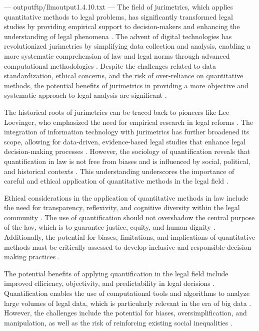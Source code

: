 ---
outputftp/llmoutput1.4.10.txt
---
The field of jurimetrics, which applies quantitative methods to legal problems, has significantly transformed legal studies by providing empirical support to decision-makers and enhancing the understanding of legal phenomena \cite{10.1007/s11186-021-09453-1,10.3390/fi9040068}. The advent of digital technologies has revolutionized jurimetrics by simplifying data collection and analysis, enabling a more systematic comprehension of law and legal norms through advanced computational methodologies \cite{10.1007/s11186-021-09453-1,unger2021process}. Despite the challenges related to data standardization, ethical concerns, and the risk of over-reliance on quantitative methods, the potential benefits of jurimetrics in providing a more objective and systematic approach to legal analysis are significant \cite{jurimetricschallenges}.

The historical roots of jurimetrics can be traced back to pioneers like Lee Loevinger, who emphasized the need for empirical research in legal reforms \cite{1023071190721}. The integration of information technology with jurimetrics has further broadened its scope, allowing for data-driven, evidence-based legal studies that enhance legal decision-making processes \cite{10.1007/s11186-021-09453-1,unger2021process}. However, the sociology of quantification reveals that quantification in law is not free from biases and is influenced by social, political, and historical contexts \cite{10.1590/dados.2022.65.3.267,10.1007/978-3-319-44000-215}. This understanding underscores the importance of careful and ethical application of quantitative methods in the legal field \cite{smith2021}.

Ethical considerations in the application of quantitative methods in law include the need for transparency, reflexivity, and cognitive diversity within the legal community \cite{silva2023role,nunes2016jurimetria}. The use of quantification should not overshadow the central purpose of the law, which is to guarantee justice, equity, and human dignity \cite{silva2023role,nunes2016jurimetria}. Additionally, the potential for biases, limitations, and implications of quantitative methods must be critically assessed to develop inclusive and responsible decision-making practices \cite{silva2023role,nunes2016jurimetria}.

The potential benefits of applying quantification in the legal field include improved efficiency, objectivity, and predictability in legal decisions \cite{silva2023role,nunes2016jurimetria}. Quantification enables the use of computational tools and algorithms to analyze large volumes of legal data, which is particularly relevant in the era of big data \cite{silva2023role,nunes2016jurimetria}. However, the challenges include the potential for biases, oversimplification, and manipulation, as well as the risk of reinforcing existing social inequalities \cite{silva2023role,nunes2016jurimetria}.


